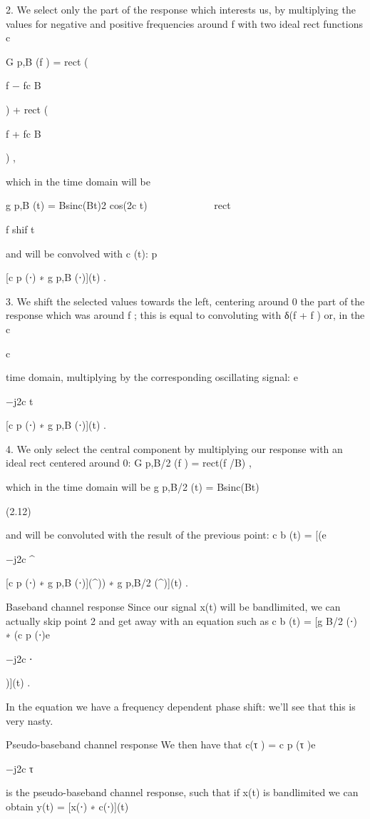 {2. We select only the part of the response which interests us, by multiplying the values for negative and positive frequencies around f with two ideal rect functions c

G p,B (f ) = rect (

f − fc B

) + rect (

f + fc B

) ,

which in the time domain will be

g p,B (t) = Bsinc(Bt)2 cos(2\pif c t)









rect

f shif t

and will be convolved with c (t):
p

[c p (⋅) ∗ g p,B (⋅)](t) .

3. We shift the selected values towards the left, centering around 0 the part of the response which was around f ; this is equal to convoluting with δ(f + f ) or, in the c

c

time domain, multiplying by the corresponding oscillating signal:
e

−j2\pif c t

[c p (⋅) ∗ g p,B (⋅)](t) .

4. We only select the central component by multiplying our response with an ideal rect centered around 0:
G p,B/2 (f ) = rect(f /B) ,

which in the time domain will be g p,B/2 (t) = Bsinc(Bt)

(2.12)

and will be convoluted with the result of the previous point:
c b (t) = [(e

−j2\pif c ^\star

[c p (⋅) ∗ g p,B (⋅)](^\star)) ∗ g p,B/2 (^\star)](t) .

Baseband channel response Since our signal x(t) will be bandlimited, we can actually skip point 2 and get away with an equation such as c b (t) = [g B/2 (⋅) ∗ (c p (⋅)e

−j2\pif c ⋅

)](t) .

In the equation we have a frequency dependent phase shift: we'll see that this is very nasty.

Pseudo-baseband channel response We then have that c(τ ) = c p (τ )e

−j2\pif c τ

is the pseudo-baseband channel response, such that if x(t) is bandlimited we can obtain y(t) = [x(⋅) ∗ c(⋅)](t)

}
